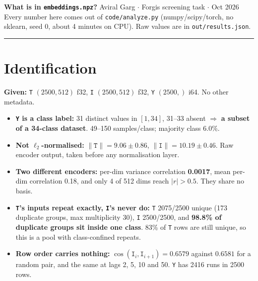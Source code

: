 \documentclass[8pt]{extarticle}
\newcommand{\hl}[1]{\textcolor{acc}{\textbf{#1}}}
\newcommand{\B}[1]{\textbf{#1}}
\begin{document}
{\large\bfseries What is in \texttt{embeddings.npz}?}\hfill
{\footnotesize Aviral Garg \;$\cdot$\; Forgis screening task \;$\cdot$ Oct 2026}\\[1pt]
{\footnotesize Every number here comes out of \texttt{code/analyze.py} (numpy/scipy/torch, no sklearn, seed 0,
about 4 minutes on CPU). Raw values are in \texttt{out/results.json}.}
\vspace{1.5pt}\hrule\vspace{1pt}

\section{Identification}

\B{Given:} \texttt{T} $(2500,512)$ f32, \texttt{I} $(2500,512)$ f32, \texttt{Y} $(2500,)$ i64. No other metadata.

\begin{itemize}
\item \B{\texttt{Y} is a class label:} 31 distinct values in $[1,34]$, 31--33 absent $\Rightarrow$ \hl{a subset of a
      34-class dataset}. 49--150 samples/class; majority class 6.0\%.
\item \B{Not $\ell_2$-normalised:} $\|\texttt{T}\|=9.06{\pm}0.86$, $\|\texttt{I}\|=10.19{\pm}0.46$. Raw encoder
      output, taken before any normalisation layer.
\item \B{Two different encoders:} per-dim variance correlation \hl{0.0017}, mean per-dim correlation 0.18, and
      only 4 of 512 dims reach $|r|>0.5$. They share no basis.
\item \B{\texttt{T}'s inputs repeat exactly, \texttt{I}'s never do:} \texttt{T} 2075/2500 unique (173 duplicate
      groups, max multiplicity 30), \texttt{I} 2500/2500, and \hl{98.8\% of duplicate groups sit inside one
      class}. 83\% of \texttt{T} rows are still unique, so this is a pool with class-confined repeats.
\item \B{Row order carries nothing:} $\cos(\texttt{I}_i,\texttt{I}_{i+1})=0.6579$ against $0.6581$ for a random
      pair, and the same at lags 2, 5, 10 and 50. \texttt{Y} has 2416 runs in 2500 rows.
\end{itemize}
\end{document}
